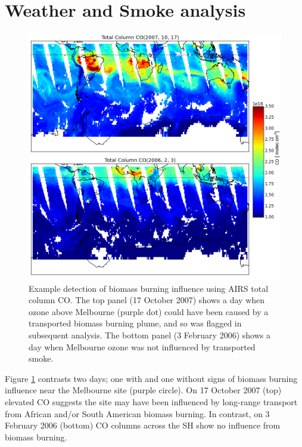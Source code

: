 
\section{Weather and Smoke analysis}
  \label{sec:WeatherSmoke}
  
  \begin{figure}[t]
      \includegraphics[width=12cm]{../figures/AIRS_compare.png}
      \caption{ %
	Example detection of biomass burning influence using AIRS total column CO. 
	The top panel (17 October 2007) shows a day when ozone above Melbourne (purple dot) could have been caused by a transported biomass burning plume, and so was flagged in subsequent analysis.
	The bottom panel (3 February 2006) shows a day when Melbourne ozone was not influenced by transported smoke.}
      \label{fig:excludedeg}
    \end{figure}

    Figure \ref{fig:excludedeg} contrasts two days; one with and one without signs of biomass burning influence near the Melbourne site (purple circle).
    On 17 October 2007 (top) elevated CO suggests the site may have been influenced by long-range transport from African and/or South American biomass burning.
    In contrast, on 3 February 2006 (bottom) CO columns across the SH show no influence from biomass burning.
    
